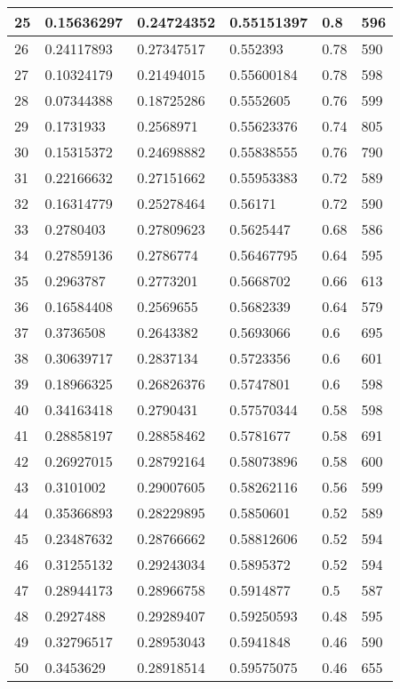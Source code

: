 \begin{longtable}{|l|l|l|l|l|l|}
25 & 0.15636297 & 0.24724352 & 0.55151397 & 0.8 & 596 \\ \hline 
26 & 0.24117893 & 0.27347517 & 0.552393 & 0.78 & 590 \\ \hline 
27 & 0.10324179 & 0.21494015 & 0.55600184 & 0.78 & 598 \\ \hline 
28 & 0.07344388 & 0.18725286 & 0.5552605 & 0.76 & 599 \\ \hline 
29 & 0.1731933 & 0.2568971 & 0.55623376 & 0.74 & 805 \\ \hline 
30 & 0.15315372 & 0.24698882 & 0.55838555 & 0.76 & 790 \\ \hline 
31 & 0.22166632 & 0.27151662 & 0.55953383 & 0.72 & 589 \\ \hline 
32 & 0.16314779 & 0.25278464 & 0.56171 & 0.72 & 590 \\ \hline 
33 & 0.2780403 & 0.27809623 & 0.5625447 & 0.68 & 586 \\ \hline 
34 & 0.27859136 & 0.2786774 & 0.56467795 & 0.64 & 595 \\ \hline 
35 & 0.2963787 & 0.2773201 & 0.5668702 & 0.66 & 613 \\ \hline 
36 & 0.16584408 & 0.2569655 & 0.5682339 & 0.64 & 579 \\ \hline 
37 & 0.3736508 & 0.2643382 & 0.5693066 & 0.6 & 695 \\ \hline 
38 & 0.30639717 & 0.2837134 & 0.5723356 & 0.6 & 601 \\ \hline 
39 & 0.18966325 & 0.26826376 & 0.5747801 & 0.6 & 598 \\ \hline 
40 & 0.34163418 & 0.2790431 & 0.57570344 & 0.58 & 598 \\ \hline 
41 & 0.28858197 & 0.28858462 & 0.5781677 & 0.58 & 691 \\ \hline 
42 & 0.26927015 & 0.28792164 & 0.58073896 & 0.58 & 600 \\ \hline 
43 & 0.3101002 & 0.29007605 & 0.58262116 & 0.56 & 599 \\ \hline 
44 & 0.35366893 & 0.28229895 & 0.5850601 & 0.52 & 589 \\ \hline 
45 & 0.23487632 & 0.28766662 & 0.58812606 & 0.52 & 594 \\ \hline 
46 & 0.31255132 & 0.29243034 & 0.5895372 & 0.52 & 594 \\ \hline 
47 & 0.28944173 & 0.28966758 & 0.5914877 & 0.5 & 587 \\ \hline 
48 & 0.2927488 & 0.29289407 & 0.59250593 & 0.48 & 595 \\ \hline 
49 & 0.32796517 & 0.28953043 & 0.5941848 & 0.46 & 590 \\ \hline 
50 & 0.3453629 & 0.28918514 & 0.59575075 & 0.46 & 655 \\ \hline 
\end{longtable}